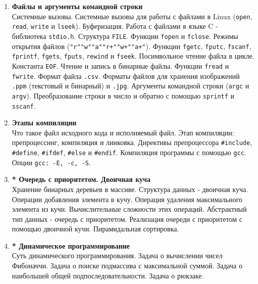 \documentclass{article}
\begin{document}
\begin{enumerate}
\item \textbf{Файлы и аргументы командной строки}\\
Системные вызовы. Системные вызовы для работы с файлами в Linux (\texttt{open}, \texttt{read}, \texttt{write} и \texttt{lseek}). Буферизация. Работа с файлами в языке C - библиотека \texttt{stdio.h}. Структура \texttt{FILE}. Функции \texttt{fopen} и \texttt{fclose}. Режимы открытия файлов (\texttt{"r"\quad "w"\quad "a"\quad "r+"\quad "w+"\quad "a+"}). Функции \texttt{fgetc}, \texttt{fputc}, \texttt{fscanf}, \texttt{fprintf}, \texttt{fgets}, \texttt{fputs}, \texttt{rewind} и \texttt{fseek}. Посимвольное чтение файла в цикле. Константа \texttt{EOF}. Чтение и запись в бинарные файлы. Функции \texttt{fread} и \texttt{fwrite}. Формат файла \texttt{.csv}. Форматы файлов для хранения изображений \texttt{.ppm} (текстовый и бинарный) и \texttt{.jpg}. Аргументы командной строки (\texttt{argc} и \texttt{argv}). Преобразование строки в число и обратно с помощью \texttt{sprintf} и \texttt{sscanf}.


\item \textbf{Этапы компиляции}\\
Что такое файл исходного кода и исполняемый файл. Этап компиляции: препроцессинг, компиляция и линковка. Директивы препроцессора \texttt{\#include}, \texttt{\#define}, \texttt{\#ifdef}, \texttt{\#else} и \texttt{\#endif}. Компиляция программы с помощью \texttt{gcc}. Опции \texttt{gcc: -E, -c, -S}.


\item \textbf{* Очередь с приоритетом. Двоичная куча}\\
Хранение бинарных деревьев в массиве. Структура данных - двоичная куча. Операции добавления элемента в кучу. Операция удаления максимального элемента из кучи. Вычислительные сложности этих операций. Абстрактный тип данных - очередь с приоритетом. Реализация очереди с приоритетом с помощью двоичной кучи. Пирамидальная сортировка.

\item \textbf{* Динамическое программирование}\\
Суть динамического программирования. Задача о вычислении чисел Фибоначчи. Задача о поиске подмассива с максимальной суммой. Задача о наибольшей общей подпоследовательности. Задача о рюкзаке. 

\end{enumerate}



\newpage
\end{document}

